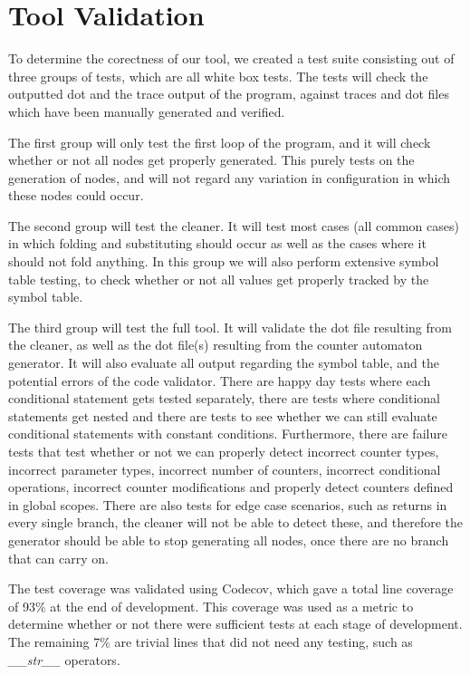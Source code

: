 \documentclass[12pt]{article}
\begin{document}
\section{Tool Validation}
To determine the corectness of our tool, we created a test suite consisting out of three groups of tests, which are all white box tests. The tests will check the outputted dot and the trace output of the program, against traces and dot files which have been manually generated and verified.

The first group will only test the first loop of the program, and it will check whether or not all nodes get properly generated. This purely tests on the generation of nodes, and will not regard any variation in configuration in which these nodes could occur.

The second group will test the cleaner. It will test most cases (all common cases) in which folding and substituting should occur as well as the cases where it should not fold anything. In this group we will also perform extensive symbol table testing, to check whether or not all values get properly tracked by the symbol table.

The third group will test the full tool. It will validate the dot file resulting from the cleaner, as well as the dot file(s) resulting from the counter automaton generator. It will also evaluate all output regarding the symbol table, and the potential errors of the code validator. There are happy day tests where each conditional statement gets tested separately, there are tests where conditional statements get nested and there are tests to see whether we can still evaluate conditional statements with constant conditions. Furthermore, there are failure tests that test whether or not we can properly detect incorrect counter types, incorrect parameter types, incorrect number of counters, incorrect conditional operations, incorrect counter modifications and properly detect counters defined in global scopes. There are also tests for edge case scenarios, such as returns in every single branch, the cleaner will not be able to detect these, and therefore the generator should be able to stop generating all nodes, once there are no branch that can carry on.

The test coverage was validated using Codecov, which gave a total line coverage of 93\% at the end of development. This coverage was used as a metric to determine whether or not there were sufficient tests at each stage of development. The remaining 7\% are trivial lines that did not need any testing, such as \textit{\_\_str\_\_} operators.
\end{document}
